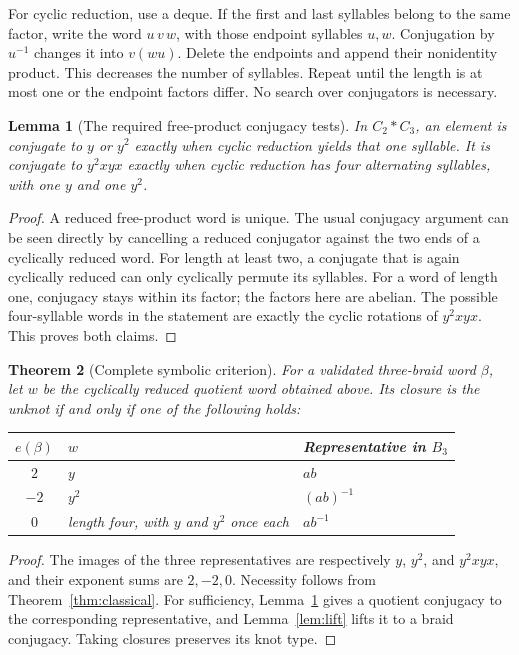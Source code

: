 \documentclass[11pt,letterpaper]{article}
\newtheorem{theorem}{Theorem}[section]
\newtheorem{lemma}[theorem]{Lemma}
\theoremstyle{definition}
\begin{document}
For cyclic reduction, use a deque. If the first and last syllables belong
to the same factor, write the word \(u\,v\,w\), with those endpoint
syllables \(u,w\). Conjugation by \(u^{-1}\) changes it into
\(v(wu)\). Delete the endpoints and append their nonidentity product.
This decreases the number of syllables. Repeat until the length is at
most one or the endpoint factors differ. No search over conjugators is
necessary.

\begin{lemma}[The required free-product conjugacy tests]
\label{lem:conj}
In \(C_2*C_3\), an element is conjugate to \(y\) or \(y^2\) exactly when
cyclic reduction yields that one syllable. It is conjugate to
\(y^2xyx\) exactly when cyclic reduction has four alternating syllables,
with one \(y\) and one \(y^2\).
\end{lemma}
\begin{proof}
A reduced free-product word is unique. The usual conjugacy argument can
be seen directly by cancelling a reduced conjugator against the two ends
of a cyclically reduced word. For length at least two, a conjugate that is
again cyclically reduced can only cyclically permute its syllables.
For a word of length one, conjugacy stays within its factor; the factors
here are abelian. The possible four-syllable words in the statement are
exactly the cyclic rotations of \(y^2xyx\). This proves both claims.
\end{proof}

\begin{theorem}[Complete symbolic criterion]
\label{thm:symbolic}
For a validated three-braid word \(\beta\), let \(w\) be the cyclically
reduced quotient word obtained above. Its closure is the unknot if and
only if one of the following holds:
\begin{center}
\begin{tabular}{@{}cll@{}}
\toprule
\(e(\beta)\) & \(w\) & Representative in \(B_3\)\\
\midrule
\(2\) & \(y\) & \(ab\)\\
\(-2\) & \(y^2\) & \((ab)^{-1}\)\\
\(0\) & length four, with \(y\) and \(y^2\) once each & \(ab^{-1}\)\\
\bottomrule
\end{tabular}
\end{center}
\end{theorem}
\begin{proof}
The images of the three representatives are respectively \(y\), \(y^2\),
and \(y^2xyx\), and their exponent sums are \(2,-2,0\).
Necessity follows from Theorem~\ref{thm:classical}.
For sufficiency, Lemma~\ref{lem:conj} gives a quotient conjugacy to the
corresponding representative, and Lemma~\ref{lem:lift} lifts it to a
braid conjugacy. Taking closures preserves its knot type.
\end{proof}
\end{document}
